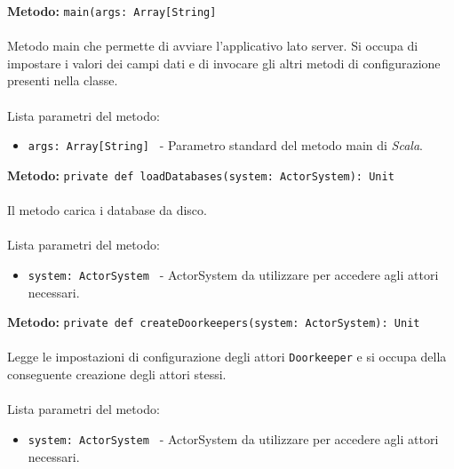 \documentclass[a4paper]{article}
\begin{document}
			\textbf{Metodo: }\texttt{main(args: Array[String]}
			\\ \\
			Metodo main che permette di avviare l'applicativo lato server. Si occupa di impostare i valori dei campi dati e di invocare gli altri metodi di configurazione presenti nella classe.
			\\ \\
			Lista parametri del metodo:
			\begin{itemize}
				\item \texttt{args: Array[String] } - Parametro standard del metodo main di \emph{Scala}.
			\end{itemize}
			\textbf{Metodo: }\texttt{private def loadDatabases(system: ActorSystem): Unit}
			\\ \\
			Il metodo carica i database da disco.
			\\ \\
			Lista parametri del metodo:
			\begin{itemize}
				\item \texttt{system: ActorSystem } - ActorSystem da utilizzare per accedere agli attori necessari.
			\end{itemize}
			\textbf{Metodo: }\texttt{private def createDoorkeepers(system: ActorSystem): Unit}
			\\ \\
			Legge le impostazioni di configurazione degli attori \texttt{Doorkeeper} e si occupa della conseguente creazione degli attori stessi.
			\\ \\
			Lista parametri del metodo:
			\begin{itemize}
				\item \texttt{system: ActorSystem } - ActorSystem da utilizzare per accedere agli attori necessari.
			\end{itemize}
			
\end{document}

